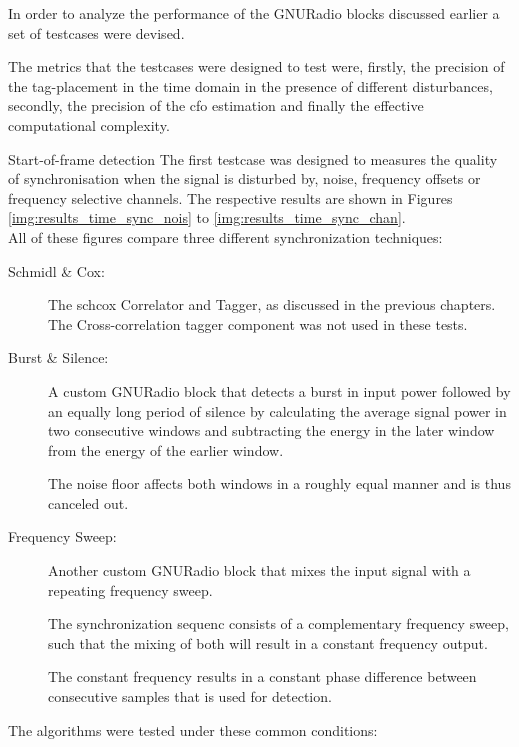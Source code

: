 In order to analyze the performance of the GNURadio blocks
discussed earlier a set of testcases were devised.

The metrics that the testcases were designed to test
were, firstly, the precision of the tag-placement in
the time domain in the presence of different disturbances,
secondly, the precision of the \gls{cfo} estimation
and finally the effective computational complexity.

\begin{subchapter}{Start-of-frame detection}
  The first testcase was designed to measures the quality
  of synchronisation when the signal is disturbed by,
  noise, frequency offsets or frequency selective channels.
  The respective results are shown in Figures \ref{img:results_time_sync_nois}
  to \ref{img:results_time_sync_chan}. \\

  \noindent All of these figures compare three different synchronization
  techniques:

  \begin{description}
    \item[Schmidl \& Cox:]
      The \acrlong{schcox} Correlator and Tagger, as discussed in the
      previous chapters.
      The Cross-correlation tagger component was not used in these tests.

    \item[Burst \& Silence:]
      A custom GNURadio block that detects a burst in input power
      followed by an equally long period of silence by calculating the
      average signal power in two consecutive windows and subtracting the
      energy in the later window from the energy of the earlier window.

      The noise floor affects both windows in a roughly equal manner
      and is thus canceled out.

    \item[Frequency Sweep:]
      Another custom GNURadio block that mixes the input signal
      with a repeating frequency sweep.

      The synchronization sequenc consists of a complementary
      frequency sweep, such that the mixing of both will result
      in a constant frequency output.

      The constant frequency results in a constant phase difference
      between consecutive samples that is used for detection.
  \end{description}

  The algorithms were tested under these common conditions:


\end{subchapter}

